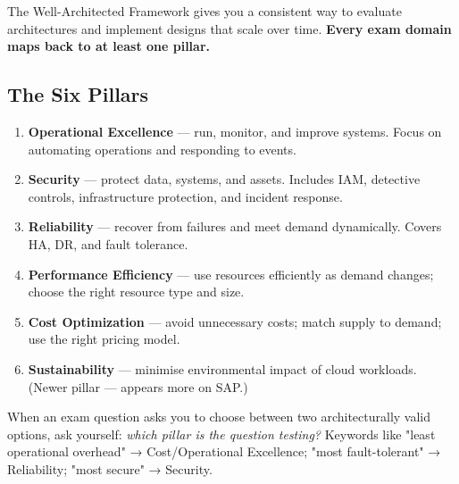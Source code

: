 

The Well-Architected Framework gives you a consistent way to evaluate architectures
and implement designs that scale over time. \textbf{Every exam domain maps back to
at least one pillar.}

\subsection{The Six Pillars}

\begin{keyfacts}
\begin{enumerate}
  \item \textbf{Operational Excellence} — run, monitor, and improve systems.
        Focus on automating operations and responding to events.
  \item \textbf{Security} — protect data, systems, and assets. Includes IAM,
        detective controls, infrastructure protection, and incident response.
  \item \textbf{Reliability} — recover from failures and meet demand dynamically.
        Covers HA, DR, and fault tolerance.
  \item \textbf{Performance Efficiency} — use resources efficiently as demand
        changes; choose the right resource type and size.
  \item \textbf{Cost Optimization} — avoid unnecessary costs; match supply to
        demand; use the right pricing model.
  \item \textbf{Sustainability} — minimise environmental impact of cloud workloads.
        (Newer pillar — appears more on SAP.)
\end{enumerate}
\end{keyfacts}

\begin{examtip}
When an exam question asks you to choose between two architecturally valid options,
ask yourself: \emph{which pillar is the question testing?} Keywords like
"least operational overhead" → Cost/Operational Excellence;
"most fault-tolerant" → Reliability; "most secure" → Security.
\end{examtip}

